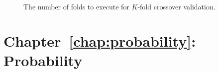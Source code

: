 \begin{description}
	\item [\parbox{2cm}{$K$}] The number of folds to execute for $K$-fold crossover validation.
\end{description}

\section{Chapter~\ref{chap:probability}: Probability}
\label{sec:symbols:probability}

\begin{description}
	\item [\parbox{2cm}{$\alpha_{0}$}]
	\item [\parbox{2cm}{$\alpha_{1}$}]
	\item [\parbox{2cm}{$\alpha_{k}$}]
	\item [\parbox{2cm}{$\alpha_{K}$}]
	\item [\parbox{2cm}{$\alpha$}]
	\item [\parbox{2cm}{$\bar{A}$}]
	\item [\parbox{2cm}{$\beta'$ }]
	\item [\parbox{2cm}{$\beta$}]
	\item [\parbox{2cm}{$Bin$}]
	\item [\parbox{2cm}{$\boldsymbol{\alpha'}$}]
	\item [\parbox{2cm}{$\boldsymbol{\alpha}$}]
	\item [\parbox{2cm}{$\boldsymbol{\mathcal{D}}$}]
	\item [\parbox{2cm}{$\boldsymbol{\theta}$}]
	\item [\parbox{2cm}{$\boldsymbol{N}$}]
	\item [\parbox{2cm}{$\boldsymbol{x_{1}}$}]
	\item [\parbox{2cm}{$\boldsymbol{x_{i}}$}]
	\item [\parbox{2cm}{$\boldsymbol{x_{I}}$}]
	\item [\parbox{2cm}{$\boldsymbol{x}$}]
	\item [\parbox{2cm}{$\boldsymbol{X}$}]
	\item [\parbox{2cm}{$\boldsymbol{Y}$}]
	\item [\parbox{2cm}{$\emptyset$}]
	\item [\parbox{2cm}{$\Gamma'(n)$}]
	\item [\parbox{2cm}{$\Gamma(n)$}]
	\item [\parbox{2cm}{$\Gamma$}]
	\item [\parbox{2cm}{$\mathbb{R}$}]
	\item [\parbox{2cm}{$\mathbbm{1}$}]

\end{description}
